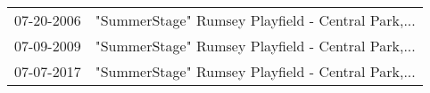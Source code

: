 \begin{supertabular}{ll}
 07-20-2006 &  "SummerStage" Rumsey Playfield - Central Park,... \\
 07-09-2009 &  "SummerStage" Rumsey Playfield - Central Park,... \\
 07-07-2017 &  "SummerStage" Rumsey Playfield - Central Park,... \\
\end{supertabular}
